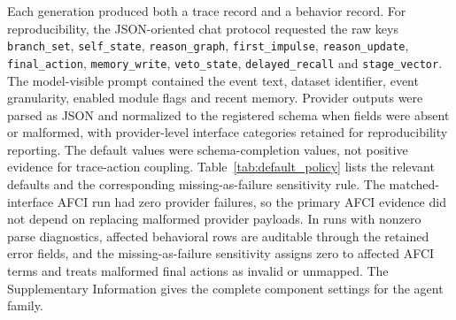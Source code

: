 ﻿\documentclass[preprint,12pt,authoryear]{elsarticle}
\begin{document}
Each generation produced both a trace record and a behavior record. For reproducibility, the JSON-oriented chat protocol requested the raw keys \texttt{branch\_set}, \texttt{self\_state}, \texttt{reason\_graph}, \texttt{first\_impulse}, \texttt{reason\_update}, \texttt{final\_action}, \texttt{memory\_write}, \texttt{veto\_state}, \texttt{delayed\_recall} and \texttt{stage\_vector}. The model-visible prompt contained the event text, dataset identifier, event granularity, enabled module flags and recent memory. Provider outputs were parsed as JSON and normalized to the registered schema when fields were absent or malformed, with provider-level interface categories retained for reproducibility reporting. The default values were schema-completion values, not positive evidence for trace-action coupling. Table~\ref{tab:default_policy} lists the relevant defaults and the corresponding missing-as-failure sensitivity rule. The matched-interface AFCI run had zero provider failures, so the primary AFCI evidence did not depend on replacing malformed provider payloads. In runs with nonzero parse diagnostics, affected behavioral rows are auditable through the retained error fields, and the missing-as-failure sensitivity assigns zero to affected AFCI terms and treats malformed final actions as invalid or unmapped. The Supplementary Information gives the complete component settings for the agent family.
\end{document}
